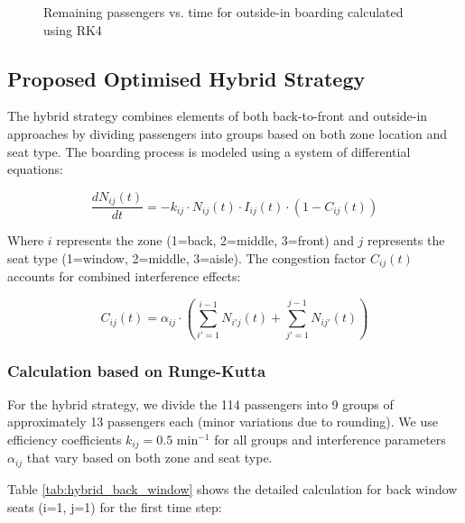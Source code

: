 \begin{figure}[h]
\centering
\caption{Remaining passengers vs. time for outside-in boarding calculated using RK4}
\label{fig:outside_in_rk4}
\end{figure}

\subsection{Proposed Optimised Hybrid Strategy}

The hybrid strategy combines elements of both back-to-front and outside-in approaches by dividing passengers into groups based on both zone location and seat type. The boarding process is modeled using a system of differential equations:

\begin{equation}
\frac{dN_{ij}(t)}{dt} = -k_{ij} \cdot N_{ij}(t) \cdot I_{ij}(t) \cdot (1-C_{ij}(t))
\end{equation}

Where $i$ represents the zone (1=back, 2=middle, 3=front) and $j$ represents the seat type (1=window, 2=middle, 3=aisle). The congestion factor $C_{ij}(t)$ accounts for combined interference effects:

\begin{equation}
C_{ij}(t) = \alpha_{ij} \cdot \left( \sum_{i'=1}^{i-1} N_{i'j}(t) + \sum_{j'=1}^{j-1} N_{ij'}(t) \right)
\end{equation}

\subsubsection{Calculation based on Runge-Kutta}

For the hybrid strategy, we divide the 114 passengers into 9 groups of approximately 13 passengers each (minor variations due to rounding). We use efficiency coefficients $k_{ij} = 0.5$ min$^{-1}$ for all groups and interference parameters $\alpha_{ij}$ that vary based on both zone and seat type.

Table \ref{tab:hybrid_back_window} shows the detailed calculation for back window seats (i=1, j=1) for the first time step:

